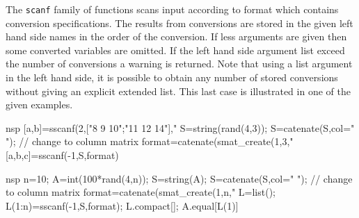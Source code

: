 \begin{mandescription}
  The \verb+scanf+ family of functions scans input according to format which contains 
  conversion specifications. The results from conversions are stored in the 
  given left hand side names in the order of the conversion. If less arguments are 
  given then some converted variables are omitted. If the left hand side argument 
  list exceed the number of conversions a warning is returned. 
  Note that using a list argument in the left hand side, it is possible to 
  obtain any number of stored conversions without giving an explicit extended list. 
  This last case is illustrated in one of the given examples. 
\end{mandescription}
\begin{examples}
  \begin{mintednsp}{nsp}
    [a,b]=sscanf(2,["8 9 10";"11 12 14"],"%
    S=string(rand(4,3));
    S=catenate(S,col=" "); // change to column matrix
    format=catenate(smat_create(1,3,"%
    [a,b,c]=sscanf(-1,S,format)
  \end{mintednsp}

  \begin{mintednsp}{nsp}
    n=10;
    A=int(100*rand(4,n));
    S=string(A);
    S=catenate(S,col=" "); // change to column matrix
    format=catenate(smat_create(1,n,"%
    L=list();
    L(1:n)=sscanf(-1,S,format);
    L.compact[];
    A.equal[L(1)]
  \end{mintednsp}

\end{examples}
\begin{manseealso}
\end{manseealso}

